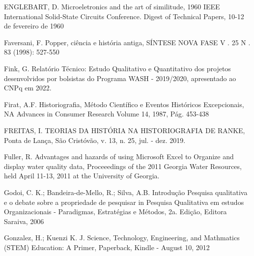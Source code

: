 \begin{flushleft}
[ENGLEBART, 2017] ENGLEBART, D. Microeletronics and the art of similitude, 1960 IEEE International Solid-State Circuits Conference. Digest of Technical Papers, 10-12 de fevereiro de 1960
\end{flushleft}


\begin{flushleft}
[FAVERSANI, 1998] Faversani, F. Popper, ciência e história antiga, SÍNTESE NOVA FASE V . 25 N . 83 (1998): 527-550
\end{flushleft}


\begin{flushleft}
[FINK, 2022] Fink, G. Relatório Técnico: Estudo Qualitativo e Quantitativo dos projetos desenvolvidos por bolsistas do Programa WASH - 2019/2020, apresentado ao CNPq em 2022.
\end{flushleft}


\begin{flushleft}
[FIRAT, 1987] Firat, A.F. Historiografia, Método Científico e Eventos Históricos Excepcionais, NA Advances in Consumer Research Volume 14, 1987, Pág. 453-438
\end{flushleft}


\begin{flushleft}
[FREITAS, 2019] FREITAS, I. TEORIAS DA HISTÓRIA NA HISTORIOGRAFIA DE RANKE, Ponta de Lança, São Cristóvão, v. 13, n. 25, jul. - dez. 2019.
\end{flushleft}


\begin{flushleft}
[FULLER, 2011] Fuller, R. Advantages and hazards of using Microsoft Excel to Organize and display water quality data, Proceeedings of the 2011 Georgia Water Resources, held April 11-13, 2011 at the University of Georgia.
\end{flushleft}


\begin{flushleft}
[GODOI et al., 2006] Godoi, C. K.; Bandeira-de-Mello, R.; Silva, A.B. Introdução Pesquisa qualitativa e o debate sobre a propriedade de pesquisar in Pesquisa Qualitativa em estudos Organizacionais - Paradigmas, Estratégias e Métodos, 2a. Edição, Editora Saraiva, 2006
\end{flushleft}


\begin{flushleft}
 Gonzalez, H.; Kuenzi K. J. Science, Technology, Engineering, and Mathmatics (STEM) Education: A Primer, Paperback, Kindle - August 10, 2012
\end{flushleft}


